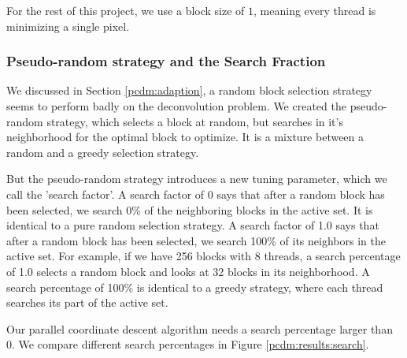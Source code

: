 For the rest of this project, we use a block size of $1$, meaning every thread is minimizing a single pixel.


\subsubsection{Pseudo-random strategy and the Search Fraction}\label{pcdm:results:fraction}
We discussed in Section \ref{pcdm:adaption}, a random block selection strategy seems to perform badly on the deconvolution problem. We created the pseudo-random strategy, which selects a block at random, but searches in it's neighborhood for the optimal block to optimize. It is a mixture between a random and a greedy selection strategy.

But the pseudo-random strategy introduces a new tuning parameter, which we call the 'search factor'. A search factor of 0 says that after a random block has been selected, we search 0\% of the neighboring blocks in the active set. It is identical to a pure random selection strategy. A search factor of 1.0 says that after a random block has been selected, we search 100\% of its neighbors in the active set. For example, if we have 256 blocks with 8 threads, a search percentage of 1.0 selects a random block and looks at 32 blocks in its neighborhood. A search percentage of 100\% is identical to a greedy strategy, where each thread searches its part of the active set.

Our parallel coordinate descent algorithm needs a search percentage larger than 0. We compare different search percentages in Figure \ref{pcdm:results:search}.

